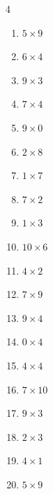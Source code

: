 \begin{multicols}{4}
\begin{enumerate}
  \item $5\times 9$
        \phantom{$=45$}

  \item $6\times 4$
        \phantom{$=24$}

  \item $9\times 3$
        \phantom{$=27$}

  \item $7\times 4$
        \phantom{$=28$}

  \item $9\times 0$
        \phantom{$=0$}

  \item $2\times 8$
        \phantom{$=16$}

  \item $1\times 7$
        \phantom{$=7$}

  \item $7\times 2$
        \phantom{$=14$}

  \item $1\times 3$
        \phantom{$=3$}

  \item $10\times 6$
        \phantom{$=60$}

  \item $4\times 2$
        \phantom{$=8$}

  \item $7\times 9$
        \phantom{$=63$}

  \item $9\times 4$
        \phantom{$=36$}

  \item $0\times 4$
        \phantom{$=0$}

  \item $4\times 4$
        \phantom{$=16$}

  \item $7\times 10$
        \phantom{$=70$}

  \item $9\times 3$
        \phantom{$=27$}

  \item $2\times 3$
        \phantom{$=6$}

\columnbreak %

\resetques

  \item $4\times 1$
        \phantom{$=4$}

  \item $5\times 9$
        \phantom{$=45$}


\end{enumerate}
\end{multicols}
